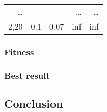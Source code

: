 \documentclass{scrartcl}
\begin{document}
\begin{table}[htbp]
\begin{tabular}{r r r|r r }
\dots & & & \dots & \dots \\
2,20 & 0.1 & 0.07 & inf & inf \\ 
\end{tabular}
\label{}
\end{table}


\subsubsection{Fitness}

\subsubsection{Best result}

\subsection{Conclusion}








%



\end{document}
